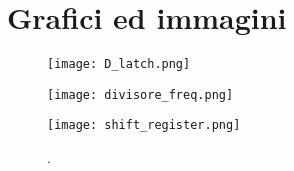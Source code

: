 \section{Grafici ed immagini}

\begin{figure}[h]
	\centering
	\texttt{[image: D\_latch.png]}
	\caption{}
	\label{f:D-latch}
\end{figure}

\begin{figure}[h]
	\centering
	\texttt{[image: divisore\_freq.png]}
	\caption{}
	\label{f:contatore}
\end{figure}

\begin{figure}[h]
	\centering
	\texttt{[image: shift\_register.png]}
	\caption{.}
	\label{f:shift_register}
\end{figure}